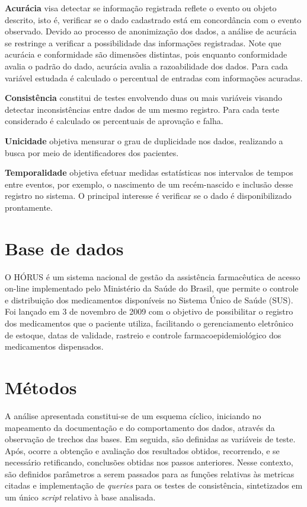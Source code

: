 \documentclass[
  12,
  table]{proadi}
\begin{document}
\textbf{Acurácia} visa detectar se informação registrada reflete o
evento ou objeto descrito, isto é, verificar se o dado cadastrado está
em concordância com o evento observado. Devido ao processo de
anonimização dos dados, a análise de acurácia se restringe a verificar a
possibilidade das informações registradas. Note que acurácia e
conformidade são dimensões distintas, pois enquanto conformidade avalia
o padrão do dado, acurácia avalia a razoabilidade dos dados. Para cada
variável estudada é calculado o percentual de entradas com informações
acuradas.

\textbf{Consistência} constitui de testes envolvendo duas ou mais
variáveis visando detectar inconsistências entre dados de um mesmo
registro. Para cada teste considerado é calculado os percentuais de
aprovação e falha.

\textbf{Unicidade} objetiva mensurar o grau de duplicidade nos dados,
realizando a busca por meio de identificadores dos pacientes.

\textbf{Temporalidade} objetiva efetuar medidas estatísticas nos
intervalos de tempos entre eventos, por exemplo, o nascimento de um
recém-nascido e inclusão desse registro no sistema. O principal
interesse é verificar se o dado é disponibilizado prontamente.

\hypertarget{base-de-dados}{%
\section{Base de dados}\label{base-de-dados}}

O HÓRUS é um sistema nacional de gestão da assistência farmacêutica de
acesso on-line implementado pelo Ministério da Saúde do Brasil, que
permite o controle e distribuição dos medicamentos disponíveis no
Sistema Único de Saúde (SUS). Foi lançado em 3 de novembro de 2009 com o
objetivo de possibilitar o registro dos medicamentos que o paciente
utiliza, facilitando o gerenciamento eletrônico de estoque, datas de
validade, rastreio e controle farmacoepidemiológico dos medicamentos
dispensados.

\renewcommand{\arraystretch}{1.25}

\renewcommand{\arraystretch}{1}

\hypertarget{muxe9todos}{%
\section{Métodos}\label{muxe9todos}}

A análise apresentada constitui-se de um esquema cíclico, iniciando no
mapeamento da documentação e do comportamento dos dados, através da
observação de trechos das bases. Em seguida, são definidas as variáveis
de teste. Após, ocorre a obtenção e avaliação dos resultados obtidos,
recorrendo, e se necessário retificando, conclusões obtidas nos passos
anteriores. Nesse contexto, são definidos parâmetros a serem passados
para as funções relativas às metricas citadas e implementação de
\emph{queries} para os testes de consistência, sintetizados em um único
\emph{script} relativo à base analisada.
\end{document}

